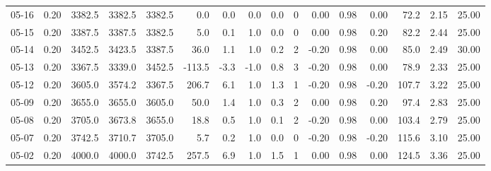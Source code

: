 \begin{threeparttable}
{\begin{tabular}{lrrrrrrrrrrrrrrr}
  05-16 &     0.20 & 3382.5 & 3382.5 & 3382.5 &        0.0 &            0.0 &                      0.0 &                 0.0 &              0 &       0.00 &      0.98 &           0.00 &             72.2 &            2.15 &                  25.00 \\
  05-15 &     0.20 & 3387.5 & 3387.5 & 3382.5 &        5.0 &            0.1 &                      1.0 &                 0.0 &              0 &       0.00 &      0.98 &           0.20 &             82.2 &            2.44 &                  25.00 \\
  05-14 &     0.20 & 3452.5 & 3423.5 & 3387.5 &       36.0 &            1.1 &                      1.0 &                 0.2 &              2 &      -0.20 &      0.98 &           0.00 &             85.0 &            2.49 &                  30.00 \\
  05-13 &     0.20 & 3367.5 & 3339.0 & 3452.5 &     -113.5 &           -3.3 &                     -1.0 &                 0.8 &              3 &      -0.20 &      0.98 &           0.00 &             78.9 &            2.33 &                  25.00 \\
  05-12 &     0.20 & 3605.0 & 3574.2 & 3367.5 &      206.7 &            6.1 &                      1.0 &                 1.3 &              1 &      -0.20 &      0.98 &          -0.20 &            107.7 &            3.22 &                  25.00 \\
  05-09 &     0.20 & 3655.0 & 3655.0 & 3605.0 &       50.0 &            1.4 &                      1.0 &                 0.3 &              2 &       0.00 &      0.98 &           0.20 &             97.4 &            2.83 &                  25.00 \\
  05-08 &     0.20 & 3705.0 & 3673.8 & 3655.0 &       18.8 &            0.5 &                      1.0 &                 0.1 &              2 &      -0.20 &      0.98 &           0.00 &            103.4 &            2.79 &                  25.00 \\
  05-07 &     0.20 & 3742.5 & 3710.7 & 3705.0 &        5.7 &            0.2 &                      1.0 &                 0.0 &              0 &      -0.20 &      0.98 &          -0.20 &            115.6 &            3.10 &                  25.00 \\
  05-02 &     0.20 & 4000.0 & 4000.0 & 3742.5 &      257.5 &            6.9 &                      1.0 &                 1.5 &              1 &       0.00 &      0.98 &           0.00 &            124.5 &            3.36 &                  25.00 \\

\end{tabular}}
\end{threeparttable}
